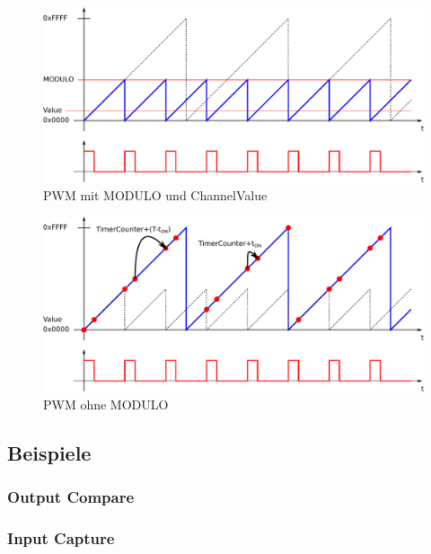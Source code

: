 \begin{figure}[h!]
	\centering
	\includegraphics[width=1\textwidth]{../fig/pwm_01.pdf}
	\caption{PWM mit MODULO und ChannelValue}
\end{figure}

\begin{figure}[h!]
	\centering
	\includegraphics[width=1\textwidth]{../fig/pwm_02.pdf}
	\caption{PWM ohne MODULO}
\end{figure}

\newpage
\subsection{Beispiele}

\subsubsection{Output Compare}



\newpage
\subsubsection{Input Capture}



